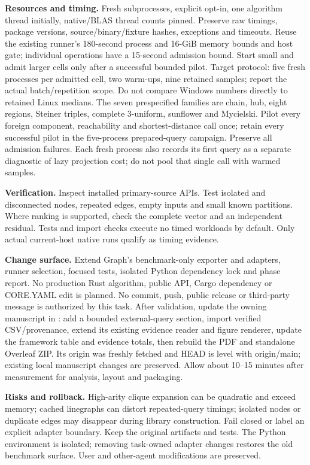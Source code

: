 \documentclass[10pt,a4paper]{article}
\begin{document}
\textbf{Resources and timing.} Fresh subprocesses, explicit opt-in, one algorithm
thread initially, native/BLAS thread counts pinned. Preserve raw timings,
package versions, source/binary/fixture hashes, exceptions and timeouts. Reuse
the existing runner's 180-second process and 16-GiB memory bounds and host gate;
individual operations have a 15-second admission bound. Start small and admit
larger cells only after a successful bounded pilot. Target protocol: five fresh
processes per admitted cell, two warm-ups, nine retained samples; report the
actual batch/repetition scope. Do not compare Windows numbers directly to
retained Linux medians.
The seven prespecified families are chain, hub, eight regions, Steiner triples,
complete 3-uniform, sunflower and Mycielski. Pilot every foreign component,
reachability and shortest-distance call once; retain every successful pilot in
the five-process prepared-query campaign. Preserve all admission failures.
Each fresh process also records its first query as a separate diagnostic of
lazy projection cost; do not pool that single call with warmed samples.

\textbf{Verification.} Inspect installed primary-source APIs. Test isolated and
disconnected nodes, repeated edges, empty inputs and small known partitions.
Where ranking is supported, check the complete vector and an independent
residual. Tests and import checks execute no timed workloads by default.
Only actual current-host native runs qualify as timing evidence.

\textbf{Change surface.} Extend Graph's benchmark-only exporter and
 adapters, runner selection, focused tests,
isolated Python dependency lock and phase report. No production Rust algorithm,
public API, Cargo dependency or CORE.YAML edit is planned. No commit, push,
public release or third-party message is authorized by this task.
After validation, update the owning manuscript in
: add a bounded external-query
section, import verified CSV/provenance, extend its existing evidence reader and
figure renderer, update the framework table and evidence totals, then rebuild
the PDF and standalone Overleaf ZIP. Its origin was freshly fetched and HEAD
is level with origin/main; existing local manuscript changes are preserved.
Allow about 10--15 minutes after measurement for analysis, layout and packaging.

\textbf{Risks and rollback.} High-arity clique expansion can be quadratic and
exceed memory; cached linegraphs can distort repeated-query timings; isolated
nodes or duplicate edges may disappear during library construction. Fail closed
or label an explicit adapter boundary. Keep the original artifacts and tests.
The Python environment is isolated; removing task-owned adapter changes restores
the old benchmark surface. User and other-agent modifications are preserved.
\end{document}
